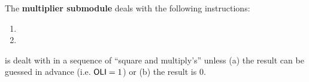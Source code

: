 The \textbf{multiplier submodule} deals with the following instructions:
\begin{multicols}{2}
\begin{enumerate}
	\item {}
	\item {}
\end{enumerate}
\end{multicols}
\noindent {} is dealt with in a sequence of ``square and multiply's'' unless (a) the result can be guessed in advance (i.e. $\textsf{OLI} = 1$) or (b) the result is $0$. 

